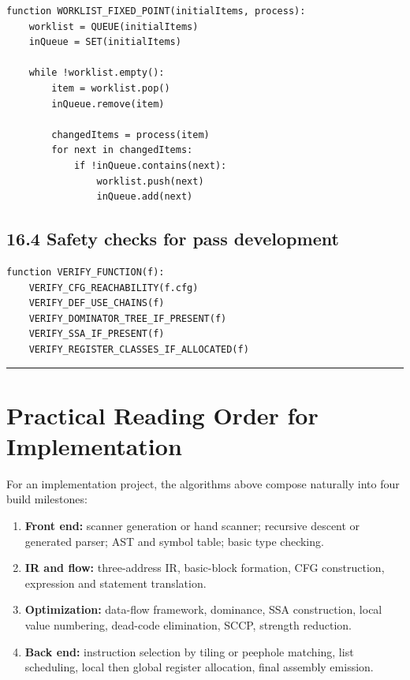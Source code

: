 \documentclass[10pt,letterpaper]{article}
\begin{document}
\begin{verbatim}
function WORKLIST_FIXED_POINT(initialItems, process):
    worklist = QUEUE(initialItems)
    inQueue = SET(initialItems)

    while !worklist.empty():
        item = worklist.pop()
        inQueue.remove(item)

        changedItems = process(item)
        for next in changedItems:
            if !inQueue.contains(next):
                worklist.push(next)
                inQueue.add(next)
\end{verbatim}

\subsection*{16.4 Safety checks for pass development}
{}

\begin{verbatim}
function VERIFY_FUNCTION(f):
    VERIFY_CFG_REACHABILITY(f.cfg)
    VERIFY_DEF_USE_CHAINS(f)
    VERIFY_DOMINATOR_TREE_IF_PRESENT(f)
    VERIFY_SSA_IF_PRESENT(f)
    VERIFY_REGISTER_CLASSES_IF_ALLOCATED(f)
\end{verbatim}

\medskip\hrule\medskip

\clearpage
\section{Practical Reading Order for Implementation}

For an implementation project, the algorithms above compose naturally into four build milestones:

\begin{enumerate}
\item \textbf{Front end:} scanner generation or hand scanner; recursive descent or generated parser; AST and symbol table; basic type checking.
\item \textbf{IR and flow:} three-address IR, basic-block formation, CFG construction, expression and statement translation.
\item \textbf{Optimization:} data-flow framework, dominance, SSA construction, local value numbering, dead-code elimination, SCCP, strength reduction.
\item \textbf{Back end:} instruction selection by tiling or peephole matching, list scheduling, local then global register allocation, final assembly emission.
\end{enumerate}
\end{document}
